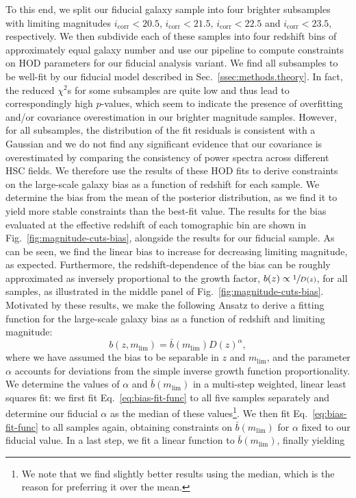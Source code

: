 \documentclass[a4paper,11pt]{article}
\begin{document}
    To this end, we split our fiducial galaxy sample into four brighter subsamples with limiting magnitudes $i_{\mathrm{corr}} < 20.5$, $i_{\mathrm{corr}} < 21.5$, $i_{\mathrm{corr}} < 22.5$ and $i_{\mathrm{corr}} < 23.5$, respectively. We then subdivide each of these samples into four redshift bins of approximately equal galaxy number and use our pipeline to compute constraints on HOD parameters for our fiducial analysis variant. We find all subsamples to be well-fit by our fiducial model described in Sec.~\ref{ssec:methods.theory}. In fact, the reduced $\chi^{2}$s for some subsamples are quite low and thus lead to correspondingly high $p$-values, which seem to indicate the presence of overfitting and/or covariance overestimation in our brighter magnitude samples. However, for all subsamples, the distribution of the fit residuals is consistent with a Gaussian and we do not find any significant evidence that our covariance is overestimated by comparing the consistency of power spectra across different HSC fields. We therefore use the results of these HOD fits to derive constraints on the large-scale galaxy bias as a function of redshift for each sample. We determine the bias from the mean of the posterior distribution, as we find it to yield more stable constraints than the best-fit value. The results for the bias evaluated at the effective redshift of each tomographic bin are shown in Fig.~\ref{fig:magnitude-cuts-bias}, alongside the results for our fiducial sample. As can be seen, we find the linear bias to increase for decreasing limiting magnitude, as expected. Furthermore, the redshift-dependence of the bias can be roughly approximated as inversely proportional to the growth factor, $b(z) \propto \sfrac{1}{D(z)}$, for all samples, as illustrated in the middle panel of Fig.~\ref{fig:magnitude-cuts-bias}. Motivated by these results, we make the following Ansatz to derive a fitting function for the large-scale galaxy bias as a function of redshift and limiting magnitude:
    \begin{equation}
      b(z, m_{\mathrm{lim}}) = \bar{b}(m_{\mathrm{lim}}) D(z)^{\alpha},
      \label{eq:bias-fit-func}
    \end{equation}
    where we have assumed the bias to be separable in $z$ and $m_{\mathrm{lim}}$, and the parameter $\alpha$ accounts for deviations from the simple inverse growth function proportionality. We determine the values of $\alpha$ and $\bar{b}(m_{\mathrm{lim}})$ in a multi-step weighted, linear least squares fit: we first fit Eq.~\ref{eq:bias-fit-func} to all five samples separately and determine our fiducial $\alpha$ as the median of these values\footnote{We note that we find slightly better results using the median, which is the reason for preferring it over the mean.}. We then fit Eq.~\ref{eq:bias-fit-func} to all samples again, obtaining constraints on $\bar{b}(m_{\mathrm{lim}})$ for $\alpha$ fixed to our fiducial value. In a last step, we fit a linear function to $\bar{b}(m_{\mathrm{lim}})$, finally yielding
\end{document}
